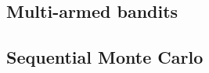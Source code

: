 \subsection{Multi-armed bandits}
\label{ssec:mab}


\subsection{Sequential Monte Carlo}
\label{ssec:smc}
